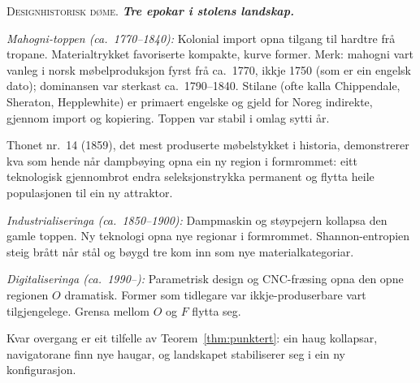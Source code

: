 \documentclass[10pt]{book}
\theoremstyle{definition}
\theoremstyle{plain}
\theoremstyle{remark}
\newenvironment{designhistorie}%
  {\medskip\noindent\textsc{Designhistorisk d\o me.}\itshape\enspace}%
  {\medskip}
\begin{document}
\begin{designhistorie}
\textbf{Tre epokar i stolens landskap.}

\textit{Mahogni-toppen (ca.~1770--1840):} Kolonial import opna tilgang til hardtre fr\aa{} tropane. Materialtrykket favoriserte kompakte, kurve former. Merk: mahogni vart vanleg i norsk m\o belproduksjon fyrst fr\aa{} ca.~1770, ikkje 1750 (som er ein engelsk dato); dominansen var sterkast ca.~1790--1840. Stilane (ofte kalla Chippendale, Sheraton, Hepplewhite) er primaert engelske og gjeld for Noreg indirekte, gjennom import og kopiering. Toppen var stabil i omlag sytti \aa r.

Thonet nr.~14 (1859), det mest produserte m\o belstykket i historia, demonstrerer kva som hende n\aa r dampb\o ying opna ein ny region i formrommet: eitt teknologisk gjennombrot endra seleksjonstrykka permanent og flytta heile populasjonen til ein ny attraktor.

\textit{Industrialiseringa (ca.~1850--1900):} Dampmaskin og st\o ypejern kollapsa den gamle toppen. Ny teknologi opna nye regionar i formrommet. Shannon-entropien steig br\aa tt n\aa r st\aa l og b\o ygd tre kom inn som nye materialkategoriar.

\textit{Digitaliseringa (ca.~1990--):} Parametrisk design og CNC-fr\ae sing opna den opne regionen $O$ dramatisk. Former som tidlegare var ikkje-produserbare vart tilgjengelege. Grensa mellom $O$ og $F$ flytta seg.

Kvar overgang er eit tilfelle av Teorem~\ref{thm:punktert}: ein haug kollapsar, navigatorane finn nye haugar, og landskapet stabiliserer seg i ein ny konfigurasjon.
\end{designhistorie}
\end{document}
